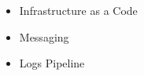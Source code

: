 
\divider

\begin{itemize}
    \item Infrastructure as a Code
\end{itemize}


\divider

\begin{itemize}
    \item Messaging
\end{itemize}


\divider

\begin{itemize}
    \item Logs Pipeline
\end{itemize}



\bigskip
\bigskip
\bigskip
\bigskip
\bigskip
\bigskip


\clearpage
